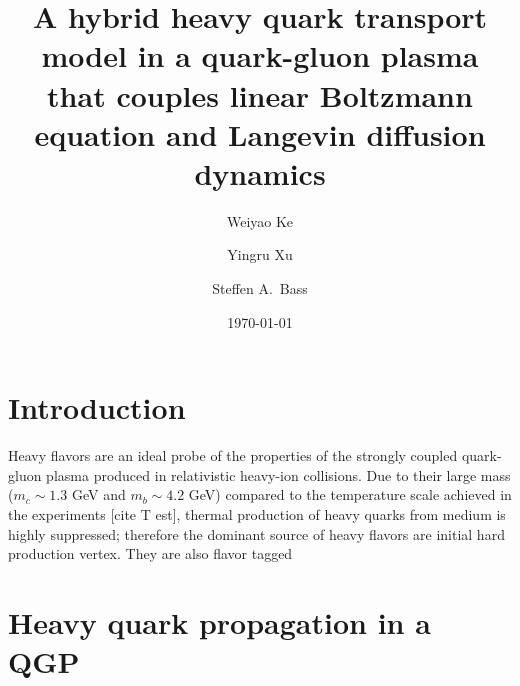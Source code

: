 \documentclass[aps, prc, reprint, amsmath, groupedaddress, nofootinbib]{revtex4-1}
\begin{document}
\title{A hybrid heavy quark transport model in a quark-gluon plasma that couples linear Boltzmann equation and Langevin diffusion dynamics}
\author{Weiyao Ke}
\author{Yingru Xu}
\author{Steffen A.\ Bass}
\date{\today}
\maketitle

\section{Introduction}
Heavy flavors are an ideal probe of the properties of the strongly coupled  quark-gluon plasma produced in relativistic heavy-ion collisions. 
Due to their large mass ($m_c\sim 1.3$ GeV and $m_b\sim 4.2$ GeV) compared to the temperature scale achieved in the experiments [cite T est], thermal production of heavy quarks from medium is highly suppressed; therefore the dominant source of heavy flavors are initial hard production vertex.
They are also flavor tagged
\section{Heavy quark propagation in a QGP}
\end{document}
